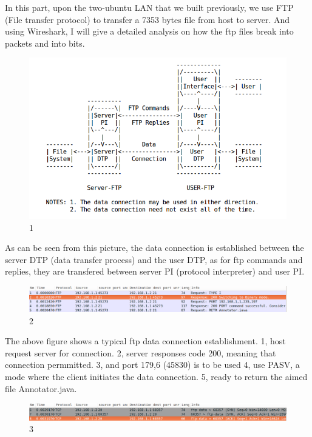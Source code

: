 \documentclass[a4paper,12pt]{article}
\begin{document}
In this part, upon the two-ubuntu LAN that we built previously, we use FTP (File transfer protocol) to transfer a 7353 bytes file from host to server. And using Wireshark, I will give a detailed analysis on how the ftp files break into packets and into bits.

\begin{figure}[ht!]
\centering
\includegraphics[width=120mm]{ftp-model.png}
\caption{1 \label{overflow}}
\end{figure}

As can be seen from this picture, the data connection is established between the server DTP (data transfer process) and the user DTP, as for ftp commands and replies, they are transfered between server PI (protocol interpreter) and user PI.

\begin{figure}[ht!]
\centering
\includegraphics[width=120mm]{1.png}
\caption{2 \label{overflow}}
\end{figure}

The above figure shows a typical ftp data connection establishment. 
1, host request server for connection.
2, server responses code 200, meaning that connection permmitted.
3, and port 179,6 (45830) is to be used
4, use PASV, a mode where the client initiates the data connection.
5, ready to return the aimed file Annotator.java.

\begin{figure}[ht!]
\centering
\includegraphics[width=120mm]{2.png}
\caption{3 \label{overflow}}
\end{figure}
\end{document}
